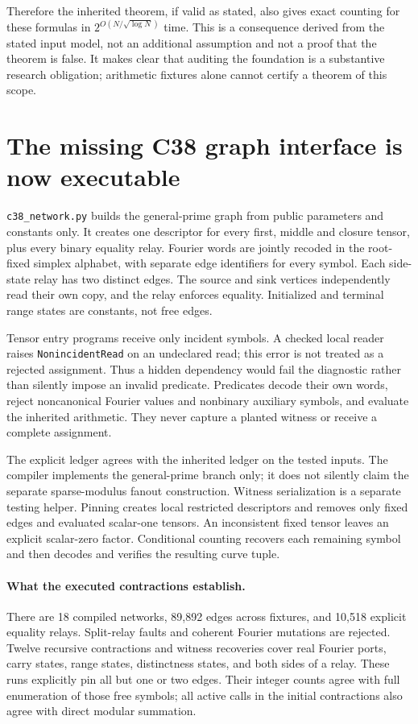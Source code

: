 \documentclass[11pt]{article}
\begin{document}
Therefore the inherited theorem, if valid as stated, also gives exact
counting for these formulas in $2^{O(N/\sqrt{\log N})}$ time. This is
a consequence derived from the stated input model, not an additional
assumption and not a proof that the theorem is false. It makes clear
that auditing the foundation is a substantive research obligation;
arithmetic fixtures alone cannot certify a theorem of this scope.

\section{The missing C38 graph interface is now executable}
\texttt{c38\_network.py} builds the general-prime graph from public
parameters and constants only. It creates one descriptor for every first,
middle and closure tensor, plus every binary equality relay. Fourier
words are jointly recoded in the root-fixed simplex alphabet, with
separate edge identifiers for every symbol. Each side-state relay has
two distinct edges. The source and sink vertices independently read
their own copy, and the relay enforces equality. Initialized and terminal
range states are constants, not free edges.

Tensor entry programs receive only incident symbols. A checked local
reader raises \texttt{NonincidentRead} on an undeclared read; this error
is not treated as a rejected assignment. Thus a hidden dependency would
fail the diagnostic rather than silently impose an invalid predicate.
Predicates decode their own words, reject noncanonical Fourier values
and nonbinary auxiliary symbols, and evaluate the inherited arithmetic.
They never capture a planted witness or receive a complete assignment.

The explicit ledger agrees with the inherited ledger on the tested
inputs. The compiler implements the general-prime branch only; it does
not silently claim the separate sparse-modulus fanout construction.
Witness serialization is a separate testing helper. Pinning creates
local restricted descriptors and removes only fixed edges and evaluated
scalar-one tensors. An inconsistent fixed tensor leaves an explicit
scalar-zero factor. Conditional counting recovers each remaining symbol
and then decodes and verifies the resulting curve tuple.

\paragraph{What the executed contractions establish.}
There are 18 compiled networks, 89,892 edges across fixtures,
and 10,518 explicit equality relays. Split-relay
faults and coherent Fourier mutations are rejected. Twelve recursive
contractions and witness recoveries cover real Fourier ports, carry
states, range states, distinctness states, and both sides of a relay.
These runs explicitly pin all but one or two edges. Their integer counts
agree with full enumeration of those free symbols; all active calls in
the initial contractions also agree with direct modular summation.
\end{document}

